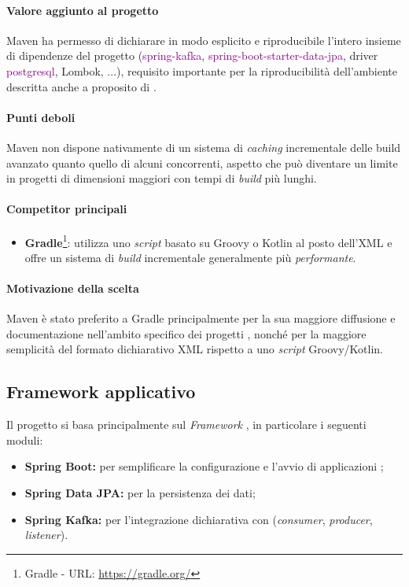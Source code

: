 \paragraph{Valore aggiunto al progetto}
Maven ha permesso di dichiarare in modo esplicito e riproducibile l'intero insieme di dipendenze del progetto (\textcolor{purple}{spring-kafka}, \textcolor{purple}{spring-boot-starter-data-jpa}, driver \textcolor{purple}{postgresql}, \gls{Lombok}, ...), requisito importante per la riproducibilità dell'ambiente descritta anche a proposito di .

\paragraph{Punti deboli}
Maven non dispone nativamente di un sistema di \textit{caching} incrementale delle build avanzato quanto quello di alcuni concorrenti, aspetto che può diventare un limite in progetti di dimensioni maggiori con tempi di \textit{build} più lunghi.

\paragraph{Competitor principali}
\begin{itemize}
    \item \textbf{Gradle}\footnote{Gradle - URL: \url{https://gradle.org/}}: utilizza uno \textit{script} basato su Groovy o Kotlin al posto dell'\acrshort{XML} e offre un sistema di \textit{build} incrementale generalmente più \textit{performante}.
\end{itemize}

\paragraph{Motivazione della scelta}
Maven è stato preferito a Gradle principalmente per la sua maggiore diffusione e documentazione nell'ambito specifico dei progetti , nonché per la maggiore semplicità del formato dichiarativo \acrshort{XML} rispetto a uno \textit{script} Groovy/Kotlin.

\newpage
\subsection{Framework applicativo}
Il progetto si basa principalmente sul \textit{\gls{Framework}} , in particolare i seguenti moduli:
\begin{itemize}
    \item \textbf{Spring Boot:} per semplificare la configurazione e l'avvio di applicazioni ;
    \item \textbf{Spring Data JPA:} per la persistenza dei dati;
    \item \textbf{Spring Kafka:} per l'integrazione dichiarativa con  (\textit{consumer}, \textit{producer}, \textit{listener}).
\end{itemize}

